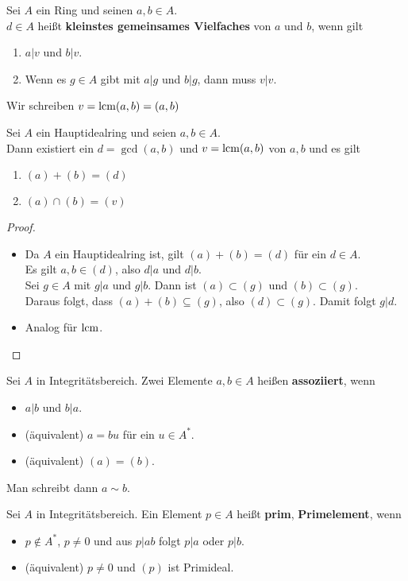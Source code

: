 	\begin{definition}
		Sei $A$ ein Ring und seinen $a,b\in A$.\\
		$d\in A$ heißt \textbf{kleinstes gemeinsames Vielfaches} von $a$ und $b$, wenn gilt
		\begin{enumerate}
			\item $a|v$ und $b|v$.
			\item Wenn es $g\in A$ gibt mit $a|g$ und $b|g$, dann muss $v|v$.
		\end{enumerate}
		Wir schreiben $v=\operatorname{lcm}(a,b)=(a,b)$
	\end{definition}

	\begin{satz}
		Sei $A$ ein Hauptidealring und seien $a,b\in A$.\\
		Dann existiert ein $d=\gcd(a,b)$ und $v=\operatorname{lcm}(a,b)$ von $a,b$ und es gilt
		\begin{enumerate}
			\item $(a)+(b)=(d)$
			\item $(a)\cap (b)=(v)$
		\end{enumerate}
	\end{satz}
	\begin{proof}
		\begin{itemize}
			\item Da $A$ ein Hauptidealring ist, gilt $(a)+(b)=(d)$ für ein $d\in A$.\\
			Es gilt $a,b\in(d)$, also $d|a$ und $d|b$.\\
			Sei $g\in A$ mit $g|a$ und $g|b$. Dann ist $(a)\subset (g)$ und $(b)\subset(g)$.\\
			Daraus folgt, dass $(a)+(b)\subseteq(g)$, also $(d)\subset (g)$. Damit folgt $g|d$.
			\item Analog für $\operatorname{lcm}$.
		\end{itemize}
	\end{proof}

	\begin{definition}
		Sei $A$ in Integritätsbereich. Zwei Elemente $a,b\in A$ heißen \textbf{assoziiert}, wenn
		 \begin{itemize}
		 	\item $a|b$ und $b|a$.
			\item (äquivalent) $a=bu$ für ein $u\in A^*$.
			\item (äquivalent) $(a)=(b)$.
		 \end{itemize}
	 Man schreibt dann $a\sim b$.
	\end{definition}

	\begin{definition}
		Sei $A$ in Integritätsbereich. Ein Element $p\in A$ heißt \textbf{prim}, \textbf{Primelement}, wenn
		\begin{itemize}
			\item $p\notin A^*$, $p\neq0$ und aus $p|ab$ folgt $p|a$ oder $p|b$.
			\item (äquivalent) $p\neq 0$ und $(p)$ ist Primideal.
		\end{itemize}
	\end{definition}

